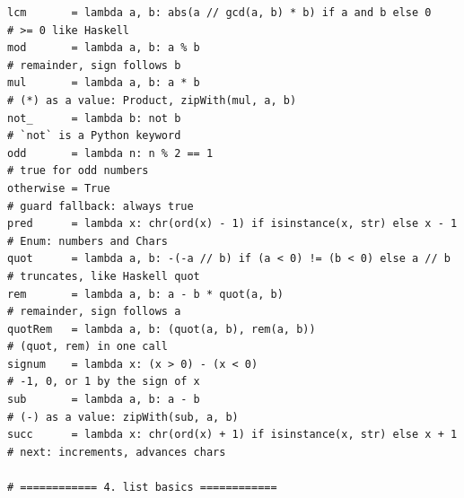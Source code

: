 \documentclass[11pt,letterpaper]{book}
\begin{document}
\begin{lstlisting}[style=file]
lcm       = lambda a, b: abs(a // gcd(a, b) * b) if a and b else 0       # >= 0 like Haskell
mod       = lambda a, b: a % b                                           # remainder, sign follows b
mul       = lambda a, b: a * b                                           # (*) as a value: Product, zipWith(mul, a, b)
not_      = lambda b: not b                                              # `not` is a Python keyword
odd       = lambda n: n % 2 == 1                                         # true for odd numbers
otherwise = True                                                        # guard fallback: always true
pred      = lambda x: chr(ord(x) - 1) if isinstance(x, str) else x - 1   # Enum: numbers and Chars
quot      = lambda a, b: -(-a // b) if (a < 0) != (b < 0) else a // b    # truncates, like Haskell quot
rem       = lambda a, b: a - b * quot(a, b)                              # remainder, sign follows a
quotRem   = lambda a, b: (quot(a, b), rem(a, b))                         # (quot, rem) in one call
signum    = lambda x: (x > 0) - (x < 0)                                  # -1, 0, or 1 by the sign of x
sub       = lambda a, b: a - b                                           # (-) as a value: zipWith(sub, a, b)
succ      = lambda x: chr(ord(x) + 1) if isinstance(x, str) else x + 1   # next: increments, advances chars

# ============ 4. list basics ============


\end{lstlisting}
\end{document}
